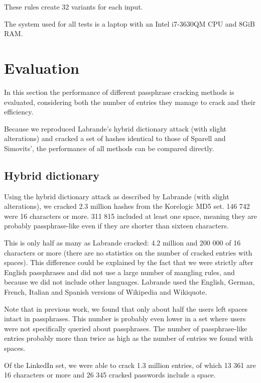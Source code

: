 \documentclass{article}
\begin{document}
These rules create 32 variants for each input.

The system used for all tests is a laptop with an Intel i7-3630QM CPU and 8GiB
RAM.


\section{Evaluation}\label{sec:eval}

In this section the performance of different passphrase cracking methods is
evaluated, considering both the number of entries they manage to crack and
their efficiency.

Because we reproduced Labrande's hybrid dictionary attack (with slight
alterations) and cracked a set of hashes identical to those of Sparell and
Simovits'\cite{sparell-simovits}, the performance of all methods can be
compared directly.


\subsection{Hybrid dictionary}\label{sub:dataset-results}

Using the hybrid dictionary attack as described by Labrande (with slight
alterations), we cracked 2.3 million hashes from the Korelogic MD5 set. 146 742
were 16 characters or more. 311 815 included at least one space, meaning they
are probably passphrase-like even if they are shorter than sixteen characters.

This is only half as many as Labrande cracked: 4.2 million and 200 000 of 16
characters or more (there are no statistics on the number of cracked entries
with spaces). This difference could be explained by the fact that we were
strictly after English passphrases and did not use a large number of mangling
rules, and because we did not include other languages. Labrande used the
English, German, French, Italian and Spanish versions of Wikipedia and
Wikiquote.

Note that in previous work\cite{own}, we found that only about half the users
left spaces intact in passphrases. This number is probably even lower in a set
where users were not specifically queried about passphrases. The number of
passphrase-like entries probably more than twice as high as the number of
entries we found with spaces.

Of the LinkedIn set, we were able to crack 1.3 million entries, of which 13 361
are 16 characters or more and 26 345 cracked passwords include a space.
\end{document}
